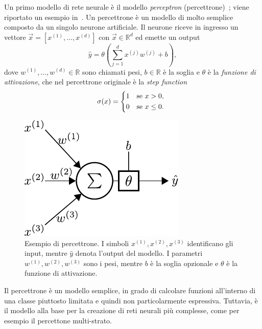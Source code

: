 Un primo modello di rete neurale è il modello \emph{perceptron} (percettrone)~\cite{1958_perceptron}; viene riportato un esempio in~.
Un percettrone è un modello di molto semplice composto da un singolo neurone artificiale.
Il neurone riceve in ingresso un vettore $\Vec{x}=[x^{(1)},\dots,x^{(d)}]$ con $\Vec{x} \in \mathbb{R}^d$ ed emette un output 
\begin{equation*}
    \hat{y} = \theta\left(\sum_{j=1}^{d}x^{(j)}w^{(j)} +b\right),
\end{equation*} 
dove $w^{(1)},\dots,w^{(d)} \in \mathbb{R}$ sono chiamati pesi, $b \in \mathbb{R}$ è la soglia e $\theta$ è la \emph{funzione di attivazione}, che nel percettrone originale è la \emph{step function} 
\begin{equation*}
    \sigma(x) =
    \begin{cases*}
      1 & se $x>0$, \\
      0 & se $x\leq0$.
    \end{cases*}
\end{equation*}
\begin{figure}
    \centering
    \includegraphics[width=0.3\linewidth]{img/perceptron.pdf}
    \caption{Esempio di percettrone. I simboli $x^{(1)},x^{(2)},x^{(3)}$ identificano gli input, mentre $\hat{y}$ denota l'output del modello. I parametri $w^{(1)},w^{(2)},w^{(3)}$ sono i pesi, mentre $b$ è la soglia opzionale e $\theta$ è la funzione di attivazione.}
    \label{fig:perceptron}
\end{figure}
Il percettrone è un modello semplice, in grado di calcolare funzioni all'interno di una classe piuttosto limitata e quindi non particolarmente espressiva.
Tuttavia, è il modello alla base per la creazione di reti neurali più complesse, come per esempio il percettone multi-strato.

